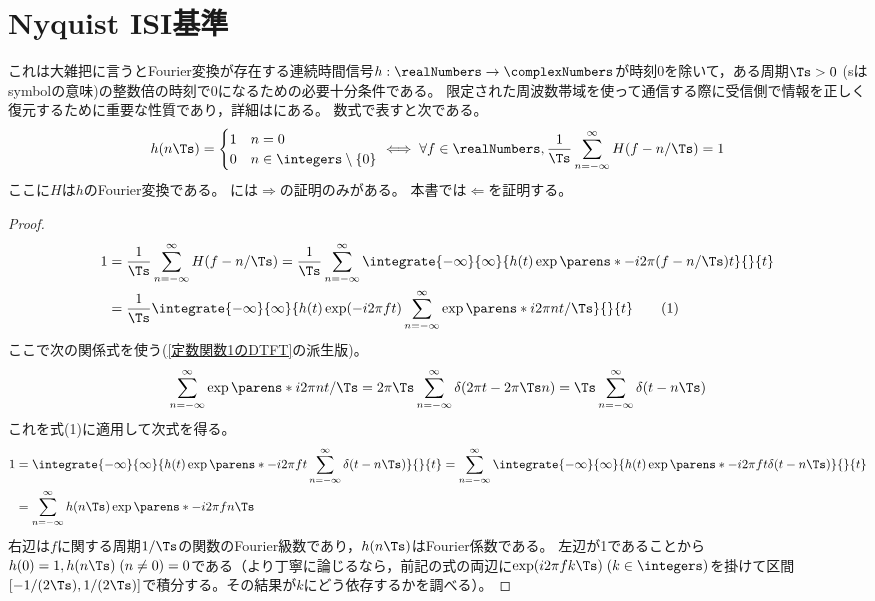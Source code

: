     \section{Nyquist ISI基準}
        これは大雑把に言うとFourier変換が存在する連続時間信号$h:\realNumbers\to\complexNumbers$が時刻0を除いて，ある周期$\Ts>0$ (sはsymbolの意味)の整数倍の時刻で0になるための必要十分条件である。
        限定された周波数帯域を使って通信する際に受信側で情報を正しく復元するために重要な性質であり，詳細は\cite{Nyquist_ISI_crit}にある。
        数式で表すと次である。
        \[
            h(n\Ts) = \begin{cases}
                1 & n=0 \\
                0 & n\in\integers\setminus\{0\}
            \end{cases}
            \iff \forall f\in\realNumbers,\frac{1}{\Ts}\sum_{n=-\infty}^\infty H(f-n/\Ts) = 1
        \]
        ここに$H$は$h$のFourier変換である。
        \cite{Nyquist_ISI_crit}には$\Rightarrow$の証明のみがある。
        本書では$\Leftarrow$を証明する。
        \begin{proof}
            \begin{align*}
                1 &= \frac{1}{\Ts}\sum_{n=-\infty}^\infty H(f-n/\Ts) = \frac{1}{\Ts}\sum_{n=-\infty}^\infty\integrate{-\infty}{\infty}{h(t)\exp\parens*{-i2\pi(f-n/\Ts)t}}{}{t} \\
                &= \frac{1}{\Ts}\integrate{-\infty}{\infty}{h(t)\exp(-i2\pi ft)\sum_{n=-\infty}^\infty\exp\parens*{i2\pi nt/\Ts}}{}{t} \tag{1}
            \end{align*}
            ここで次の関係式を使う(\ref{定数関数1のDTFT}の派生版)。
            \[ \sum_{n=-\infty}^\infty\exp\parens*{i2\pi nt/\Ts} = 2\pi\Ts\sum_{n=-\infty}^\infty\delta(2\pi t-2\pi\Ts n) = \Ts\sum_{n=-\infty}^\infty\delta(t-n\Ts) \]
            これを式(1)に適用して次式を得る。
            \begin{align*}
                1 &= \integrate{-\infty}{\infty}{h(t)\exp\parens*{-i2\pi ft}\sum_{n=-\infty}^\infty\delta(t-n\Ts)}{}{t} = \sum_{n=-\infty}^\infty\integrate{-\infty}{\infty}{h(t)\exp\parens*{-i2\pi ft}\delta(t-n\Ts)}{}{t} \\
                &= \sum_{n=-\infty}^\infty h(n\Ts)\exp\parens*{-i2\pi fn\Ts}
            \end{align*}
            右辺は$f$に関する周期$1/\Ts$の関数のFourier級数であり，$h(n\Ts)$はFourier係数である。
            左辺が1であることから$h(0) = 1,h(n\Ts)\;(n\neq 0) = 0$である（より丁寧に論じるなら，前記の式の両辺に$\exp(i2\pi fk\Ts)\;(k\in\integers)$を掛けて区間$[-1/(2\Ts),1/(2\Ts)]$で積分する。その結果が$k$にどう依存するかを調べる）。
        \end{proof}

